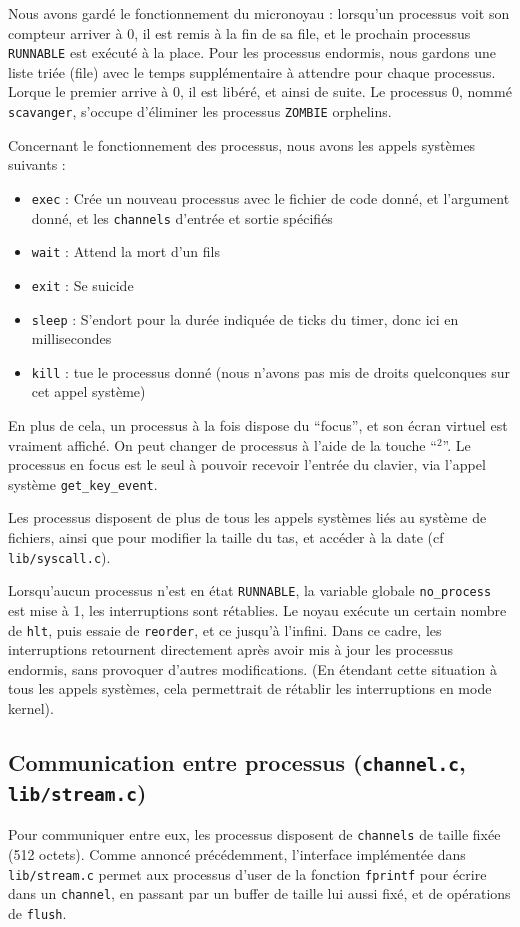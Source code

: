 \documentclass[a4paper,10pt, french]{article}
\newcommand{\code}[1]{\texttt{#1}}
\begin{document}
Nous avons gardé le fonctionnement du micronoyau : lorsqu'un processus voit son compteur arriver à 0,
il est remis à la fin de sa file, et le prochain processus \code{RUNNABLE} est exécuté à la place. Pour les 
processus endormis, nous gardons une liste triée (file) avec le temps supplémentaire à attendre pour chaque processus.
Lorque le premier arrive à 0, il est libéré, et ainsi de suite. Le processus 0, nommé \code{scavanger},
s'occupe d'éliminer les processus \code{ZOMBIE} orphelins.

Concernant le fonctionnement des processus, nous avons les appels systèmes suivants :
\begin{itemize}
 \item \code{exec} : Crée un nouveau processus avec le fichier de code donné, et l'argument donné,
 et les \code{channels} d'entrée et sortie spécifiés
 \item \code{wait} : Attend la mort d'un fils
 \item \code{exit} : Se suicide
 \item \code{sleep} : S'endort pour la durée indiquée de ticks du timer, donc ici en millisecondes
 \item \code{kill} : tue le processus donné (nous n'avons pas mis de droits quelconques sur cet appel système)
\end{itemize}

En plus de cela, un processus à la fois dispose du ``focus'', et son écran virtuel est vraiment affiché.
On peut changer de processus à l'aide de la touche ``$^2$''. Le processus en focus est le seul à pouvoir 
recevoir l'entrée du clavier, via l'appel système \code{get\_key\_event}.

Les processus disposent de plus de tous les appels systèmes liés au système de fichiers, ainsi que pour 
modifier la taille du tas, et accéder à la date (cf \code{lib/syscall.c}).

Lorsqu'aucun processus n'est en état \code{RUNNABLE}, la variable globale \code{no\_process} est mise à 1,
les interruptions sont rétablies. Le noyau exécute un certain nombre de \code{hlt}, puis essaie de \code{reorder},
et ce jusqu'à l'infini. Dans ce cadre, les interruptions retournent directement après avoir mis à jour les processus endormis, sans provoquer
d'autres modifications. (En étendant cette situation à tous les appels systèmes, cela 
permettrait de rétablir les interruptions en mode kernel).

\subsection{Communication entre processus (\code{channel.c}, \code{lib/stream.c})}
Pour communiquer entre eux, les processus disposent de \code{channels} de taille fixée (512 octets).
Comme annoncé précédemment, l'interface implémentée dans \code{lib/stream.c} permet aux processus 
d'user de la fonction \code{fprintf} pour écrire dans un \code{channel}, en passant par un buffer de taille lui aussi fixé,
et de opérations de \code{flush}.
\end{document}
